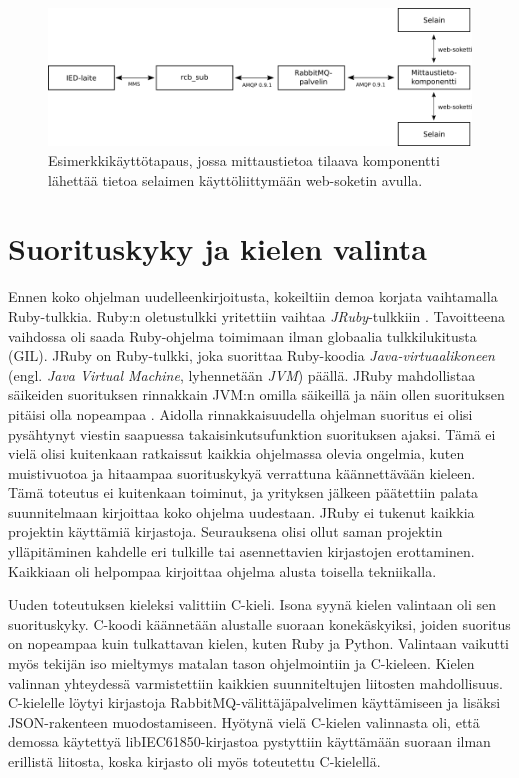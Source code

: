 \begin{figure}[ht!]
	\includegraphics[width=1\textwidth]{pictures/example-use-case.png}
	\caption{Esimerkkikäyttötapaus, jossa mittaustietoa tilaava komponentti lähettää tietoa selaimen käyttöliittymään web-soketin avulla.}
	\label{fig:example-use-case}
\end{figure}


\section{Suorituskyky ja kielen valinta}
Ennen koko ohjelman uudelleenkirjoitusta, kokeiltiin demoa korjata vaihtamalla Ruby-tulkkia. Ruby:n oletustulkki yritettiin vaihtaa \emph{JRuby}-tulkkiin \cite{jruby-homepage}. Tavoitteena vaihdossa oli saada Ruby-ohjelma toimimaan ilman globaalia tulkkilukitusta (GIL). JRuby on Ruby-tulkki, joka suorittaa Ruby-koodia \emph{Java-virtuaalikoneen} (engl. \emph{Java Virtual Machine}, lyhennetään \emph{JVM}) päällä. JRuby mahdollistaa säikeiden suorituksen rinnakkain JVM:n omilla säikeillä ja näin ollen suorituksen pitäisi olla nopeampaa \mbox{\cite{Youssef2013}}. Aidolla rinnakkaisuudella ohjelman suoritus ei olisi pysähtynyt viestin saapuessa takaisinkutsufunktion suorituksen ajaksi. Tämä ei vielä olisi kuitenkaan ratkaissut kaikkia ohjelmassa olevia ongelmia, kuten muistivuotoa ja hitaampaa suorituskykyä verrattuna käännettävään kieleen. Tämä toteutus ei kuitenkaan toiminut, ja yrityksen jälkeen päätettiin palata suunnitelmaan kirjoittaa koko ohjelma uudestaan. JRuby ei tukenut kaikkia projektin käyttämiä kirjastoja. Seurauksena olisi ollut saman projektin ylläpitäminen kahdelle eri tulkille tai asennettavien kirjastojen erottaminen. Kaikkiaan oli helpompaa kirjoittaa ohjelma alusta toisella tekniikalla.

Uuden toteutuksen kieleksi valittiin C-kieli. Isona syynä kielen valintaan oli sen suorituskyky. C-koodi käännetään alustalle suoraan konekäskyiksi, joiden suoritus on nopeampaa kuin tulkattavan kielen, kuten Ruby ja Python. Valintaan vaikutti myös tekijän iso mieltymys matalan tason ohjelmointiin ja C-kieleen. Kielen valinnan yhteydessä varmistettiin kaikkien suunniteltujen liitosten mahdollisuus. C-kielelle löytyi kirjastoja RabbitMQ-välittäjäpalvelimen käyttämiseen ja lisäksi JSON-rakenteen muodostamiseen. Hyötynä vielä C-kielen valinnasta oli, että demossa käytettyä libIEC61850-kirjastoa pystyttiin käyttämään suoraan ilman erillistä liitosta, koska kirjasto oli myös toteutettu C-kielellä.


